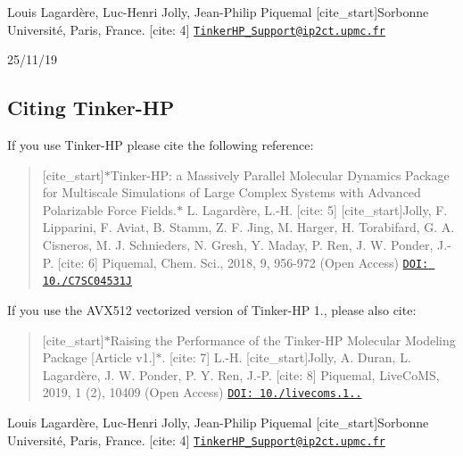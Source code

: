 Louis Lagardère, Luc-\/\-Henri Jolly, Jean-\/\-Philip Piquemal \mbox{[}cite\-\_\-start\mbox{]}Sorbonne Université, Paris, France. \mbox{[}cite\-: 4\mbox{]} \href{mailto:TinkerHP_Support@ip2ct.upmc.fr}{\tt Tinker\-H\-P\-\_\-\-Support@ip2ct.\-upmc.\-fr}

25/11/19

\subsection*{Citing Tinker-\/\-H\-P}

If you use Tinker-\/\-H\-P please cite the following reference\-:

\begin{quotation}
\mbox{[}cite\-\_\-start\mbox{]}$\ast$\-Tinker-\/\-H\-P\-: a Massively Parallel Molecular Dynamics Package for Multiscale Simulations of Large Complex Systems with Advanced Polarizable Force Fields.$\ast$ L. Lagardère, L.-\/\-H. \mbox{[}cite\-: 5\mbox{]} \mbox{[}cite\-\_\-start\mbox{]}Jolly, F. Lipparini, F. Aviat, B. Stamm, Z. F. Jing, M. Harger, H. Torabifard, G. A. Cisneros, M. J. Schnieders, N. Gresh, Y. Maday, P. Ren, J. W. Ponder, J.-\/\-P. \mbox{[}cite\-: 6\mbox{]} Piquemal, Chem. Sci., 2018, 9, 956-\/972 (Open Access) \href{https://pubs.rsc.org/en/content/articlelanding/2018/sc/c7sc04531j}{\tt D\-O\-I\-: 10./\-C7\-S\-C04531\-J}

\end{quotation}


If you use the A\-V\-X512 vectorized version of Tinker-\/\-H\-P 1., please also cite\-:

\begin{quotation}
\mbox{[}cite\-\_\-start\mbox{]}$\ast$\-Raising the Performance of the Tinker-\/\-H\-P Molecular Modeling Package \mbox{[}Article v1.\mbox{]}$\ast$. \mbox{[}cite\-: 7\mbox{]} L.-\/\-H. \mbox{[}cite\-\_\-start\mbox{]}Jolly, A. Duran, L. Lagardère, J. W. Ponder, P. Y. Ren, J.-\/\-P. \mbox{[}cite\-: 8\mbox{]} Piquemal, Live\-Co\-M\-S, 2019, 1 (2), 10409 (Open Access) \href{https:/# Tinker-HP : Readme/Quickstart (v1.2}{\tt D\-O\-I\-: 10./livecoms.1..}

\end{quotation}


Louis Lagardère, Luc-\/\-Henri Jolly, Jean-\/\-Philip Piquemal \mbox{[}cite\-\_\-start\mbox{]}Sorbonne Université, Paris, France. \mbox{[}cite\-: 4\mbox{]} \href{mailto:TinkerHP_Support@ip2ct.upmc.fr}{\tt Tinker\-H\-P\-\_\-\-Support@ip2ct.\-upmc.\-fr}

